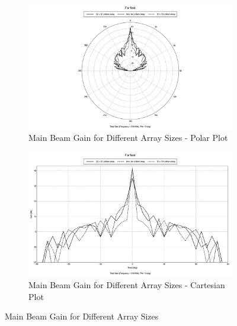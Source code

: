\documentclass[11pt]{witseiepaper}
\begin{document}
\begin{figure}[htb]
    \centering
    \begin{subfigure}{.5\textwidth}
        \centering
            \includegraphics[width=0.9\linewidth]{BigArrayGain-Polar.pdf}
            \caption{Main Beam Gain for Different Array Sizes - Polar Plot}
            \label{fig:MainBeamGain-Polar}
        \end{subfigure}%
        \begin{subfigure}{.5\textwidth}
            \centering
            \includegraphics[width=0.9\linewidth]{BigArrayGain-Cartesian.pdf}
            \caption{Main Beam Gain for Different Array Sizes - Cartesian Plot}
                \label{fig:MainBeamGain-Cartesian}
            \end{subfigure}
\caption{Main Beam Gain for Different Array Sizes}
\label{fig:MainBeamGain}
\end{figure}
\end{document}
